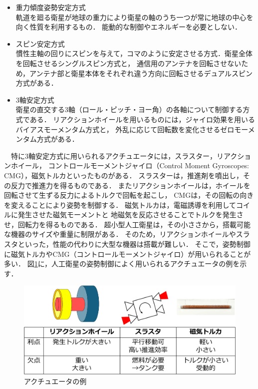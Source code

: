 \begin{itemize}
    \item 重力傾度姿勢安定方式\\
    軌道を廻る衛星が地球の重力により衛星の軸のうち一つが常に地球の中心を向く性質を利用するもの．
    能動的な制御やエネルギーを必要としない\cite{intro4}．
    \item スピン安定方式\\
    慣性主軸の回りにスピンを与えて，コマのように安定させる方式．衛星全体を回転させるシングルスピン方式と，
    通信用のアンテナを回転させないため，アンテナ部と衛星本体をそれぞれ違う方向に回転させるデュアルスピン方式がある\cite{intro5}．
    \item 3軸安定方式\\
    衛星の直交する3軸（ロール・ピッチ・ヨー角）の各軸について制御する方式である．
    リアクションホイールを用いるものには，ジャイロ効果を用いるバイアスモーメンタム方式と，
    外乱に応じて回転数を変化させるゼロモーメンタム方式がある\cite{intro5}．
\end{itemize}

　特に3軸安定方式に用いられるアクチュエータには，スラスター，リアクションホイール，
コントロールモーメントジャイロ（Control Moment Gyroscopes: CMG），磁気トルカといったものがある．
スラスターは，推進剤を噴出し，その反力で推進力を得るものである．
またリアクションホイールは，ホイールを回転させて生ずる反力によるトルクで回転を起こし，
CMGは，その回転の向きを変えることにより姿勢を制御する．
磁気トルカは，電磁誘導を利用してコイルに発生させた磁気モーメントと
地磁気を反応させることでトルクを発生させ，回転力を得るものである．
超小型人工衛星は，その小ささから，搭載可能な機器のサイズや重量に制限がある．
そのため，リアクションホイールやスラスタといった，性能の代わりに大型な機器は搭載が難しい．
そこで，姿勢制御に磁気トルカやCMG（コントロールモーメントジャイロ）が用いられることが多い．
図\ref{fig:act}に，人工衛星の姿勢制御によく用いられるアクチュエータの例を示す．

\begin{figure}[H]
	\centering
		\includegraphics[scale=0.5]{./figure/序論図-crop.pdf}
		\caption{アクチュエータの例}
		\label{fig:act}
\end{figure}

